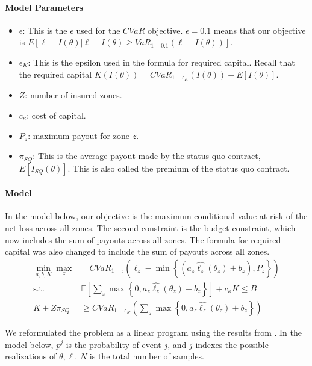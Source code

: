 \documentclass[11pt]{article}
\begin{document}
    \paragraph*{Model Parameters}
    \begin{itemize}
        \item $\epsilon$: This is the $\epsilon$ used for the $CVaR$ objective.  $\epsilon = 0.1$ means that our objective is $E[\ell - I(\theta)|\ell -I(\theta) \geq VaR_{1-0.1}\left ( \ell - I(\theta) \right )]$.  
        \item $\epsilon_K$: This is the epsilon used in the formula for required capital. Recall that the required capital $K(I(\theta)) = CVaR_{1-\epsilon_K}(I(\theta)) - E[I(\theta)]$. 
        \item $Z$: number of insured zones.
        \item $c_{\kappa}$: cost of capital. 
        \item $P_z$: maximum payout for zone $z$.
        \item $\pi_{SQ}$: This is the average payout made by the status quo contract, $E[I_{SQ}(\theta)]$. This is also called the premium of the status quo contract.   
    \end{itemize}

    \paragraph*{Model}
    In the model below, our objective is the maximum conditional value at risk of the net loss across all zones. The second constraint is the budget constraint, which now includes the sum of payouts across all zones. The formula for required capital was also changed to include the sum of payouts across all zones. 
    \begin{align}
      \min_{a,b,K} \max_z &\quad CVaR_{1-\epsilon}\left (\ell_z - \min \left \{ (a_z\hat{\ell_z}(\theta_z) + b_z), P_z \right \} \right )\\
      \text{s.t.   } & \mathbb{E}\left [ \sum_z \max \left \{ 0, a_z\hat{\ell_z}(\theta_z) + b_z \right \} \right ] + c_{\kappa} K \leq B\\
      K + Z\pi_{SQ} &\geq CVaR_{1-\epsilon_K} \left( \sum_z \max \left \{ 0,a_z\hat{\ell_z}(\theta_z) + b_z \right \} \right )
    \end{align}

    We reformulated the problem as a linear program  using the results from \cite{rockafellar2000optimization}. In the model below, $p^j$ is the probability of event $j$, and $j$ indexes the possible realizations of $\theta, \ell$. $N$ is the total number of samples. 
\end{document}
